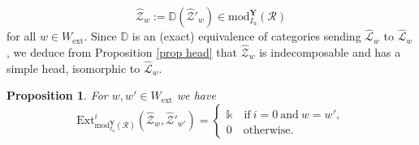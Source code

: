 \documentclass[11pt]{amsart}
\theoremstyle{plain}
\newtheorem{prop}[thm]{Proposition}
\theoremstyle{remark}
\numberwithin{equation}{section}
\begin{document}
	$$\widehat{\mathcal{Z}}_w:=\mathbb{D}(\widehat{\mathcal{Z}}'_w) \in \mathrm{mod}^\mathbf{Y}_{I_\mathrm{u}}(\mathcal{R})$$
	for all $w\in W_{\mathrm{ext}}$. Since $\mathbb{D}$ is an (exact) equivalence of categories sending $\widehat{\mathcal{L}}_w$ to $\widehat{\mathcal{L}}_w$, we deduce from Proposition \ref{prop head} that $\widehat{\mathcal{Z}}_w$ is indecomposable and has a simple head, isomorphic to $\widehat{\mathcal{L}}_w$.
	\begin{prop}{{\cite[Proposition 9.25]{achar2022geometric}}}\label{prop ext ind objects}
		For $w,w'\in W_{\mathrm{ext}}$ we have
		$$\mathrm{Ext}^i_{\mathrm{mod}^\mathbf{Y}_{I_\mathrm{u}}(\mathcal{R})}(\widehat{\mathcal{Z}}_w,\widehat{\mathcal{Z}}'_{w'})=\begin{cases} \mathbb{k}\quad\text{if}~i=0~\text{and}~w=w',\\0\quad\text{otherwise}.
		\end{cases}$$
	\end{prop}
\end{document}
